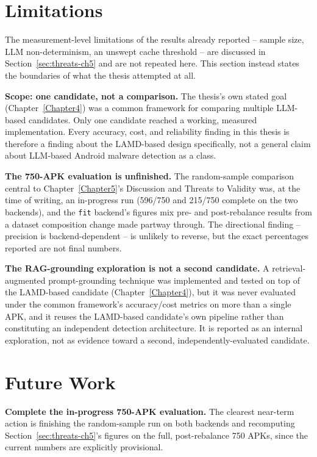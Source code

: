 \section{Limitations}\label{sec:limitations-ch6}

The measurement-level limitations of the results already reported --
sample size, LLM non-determinism, an unswept cache threshold -- are
discussed in Section~\ref{sec:threats-ch5} and are not repeated here. This
section instead states the boundaries of what the thesis attempted at
all.

\textbf{Scope: one candidate, not a comparison.} The thesis's own stated
goal (Chapter~\ref{Chapter4}) was a common framework for comparing
multiple LLM-based candidates. Only one candidate reached a working,
measured implementation. Every accuracy, cost, and reliability finding in
this thesis is therefore a finding about the LAMD-based design
specifically, not a general claim about LLM-based Android malware
detection as a class.

\textbf{The 750-APK evaluation is unfinished.} The random-sample
comparison central to Chapter~\ref{Chapter5}'s Discussion and Threats to
Validity was, at the time of writing, an in-progress run (596/750 and
215/750 complete on the two backends), and the \texttt{fit} backend's
figures mix pre- and post-rebalance results from a dataset composition
change made partway through. The directional finding -- precision is
backend-dependent -- is unlikely to reverse, but the exact percentages
reported are not final numbers.

\textbf{The RAG-grounding exploration is not a second candidate.} A
retrieval-augmented prompt-grounding technique was implemented and tested
on top of the LAMD-based candidate (Chapter~\ref{Chapter4}), but it was
never evaluated under the common framework's accuracy/cost metrics on more
than a single APK, and it reuses the LAMD-based candidate's own pipeline
rather than constituting an independent detection architecture. It is
reported as an internal exploration, not as evidence toward a second,
independently-evaluated candidate.

\section{Future Work}

\textbf{Complete the in-progress 750-APK evaluation.} The clearest
near-term action is finishing the random-sample run on both backends and
recomputing Section~\ref{sec:threats-ch5}'s figures on the full,
post-rebalance 750 APKs, since the current numbers are explicitly
provisional.

